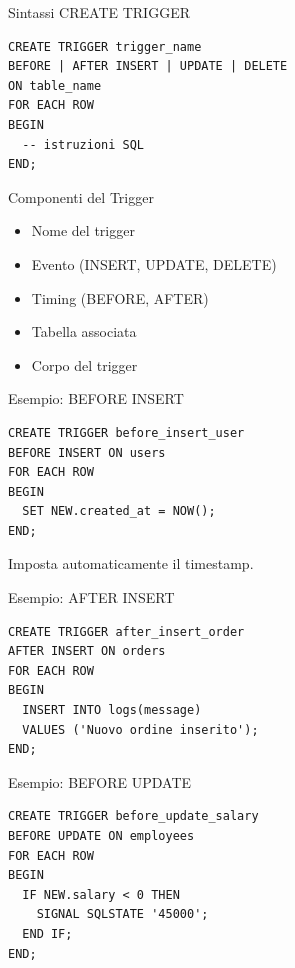 \documentclass{beamer}
\begin{document}
	\begin{frame}[fragile]{Sintassi CREATE TRIGGER}
		\begin{lstlisting}
CREATE TRIGGER trigger_name
BEFORE | AFTER INSERT | UPDATE | DELETE
ON table_name
FOR EACH ROW
BEGIN
  -- istruzioni SQL
END;
		\end{lstlisting}
	\end{frame}
	
	\begin{frame}{Componenti del Trigger}
		\begin{itemize}
			\item Nome del trigger
			\item Evento (INSERT, UPDATE, DELETE)
			\item Timing (BEFORE, AFTER)
			\item Tabella associata
			\item Corpo del trigger
		\end{itemize}
	\end{frame}
	
	\begin{frame}[fragile]{Esempio: BEFORE INSERT}
		\begin{lstlisting}
CREATE TRIGGER before_insert_user
BEFORE INSERT ON users
FOR EACH ROW
BEGIN
  SET NEW.created_at = NOW();
END;
		\end{lstlisting}
		
		\bigskip
		
		Imposta automaticamente il timestamp.
	\end{frame}
	
	\begin{frame}[fragile]{Esempio: AFTER INSERT}
		\begin{lstlisting}
CREATE TRIGGER after_insert_order
AFTER INSERT ON orders
FOR EACH ROW
BEGIN
  INSERT INTO logs(message)
  VALUES ('Nuovo ordine inserito');
END;
		\end{lstlisting}
	\end{frame}
	
	\begin{frame}[fragile]{Esempio: BEFORE UPDATE}
		\begin{lstlisting}
CREATE TRIGGER before_update_salary
BEFORE UPDATE ON employees
FOR EACH ROW
BEGIN
  IF NEW.salary < 0 THEN
    SIGNAL SQLSTATE '45000';
  END IF;
END;
		\end{lstlisting}
	\end{frame}
	
\end{document}
